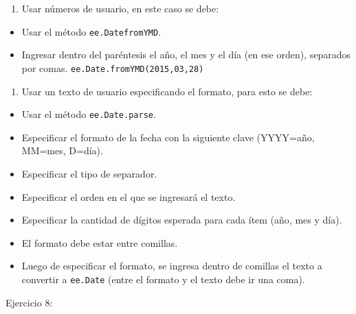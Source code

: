 \documentclass[
  12pt,
  letterpaper,
  twoside]{book}
\providecommand{\tightlist}{%
  \setlength{\itemsep}{0pt}\setlength{\parskip}{0pt}}
\begin{document}
\begin{enumerate}
\def\labelenumi{\arabic{enumi}.}
\setcounter{enumi}{1}
\tightlist
\item
  Usar números de usuario, en este caso se debe:
\end{enumerate}

\begin{itemize}
\tightlist
\item
  Usar el método \texttt{ee.DatefromYMD}.
\item
  Ingresar dentro del paréntesis el año, el mes y el día (en ese orden), separados por comas. \texttt{ee.Date.fromYMD(2015,03,28)}
\end{itemize}

\begin{enumerate}
\def\labelenumi{\arabic{enumi}.}
\setcounter{enumi}{2}
\tightlist
\item
  Usar un texto de usuario especificando el formato, para esto se debe:
\end{enumerate}

\begin{itemize}
\tightlist
\item
  Usar el método \texttt{ee.Date.parse}.
\item
  Especificar el formato de la fecha con la siguiente clave (YYYY=año, MM=mes, D=día).
\item
  Especificar el tipo de separador.
\item
  Especificar el orden en el que se ingresará el texto.
\item
  Especificar la cantidad de dígitos esperada para cada ítem (año, mes y día).
\item
  El formato debe estar entre comillas.
\item
  Luego de especificar el formato, se ingresa dentro de comillas el texto a convertir a \texttt{ee.Date} (entre el formato y el texto debe ir una coma).
\end{itemize}

Ejercicio 8:
\end{document}

